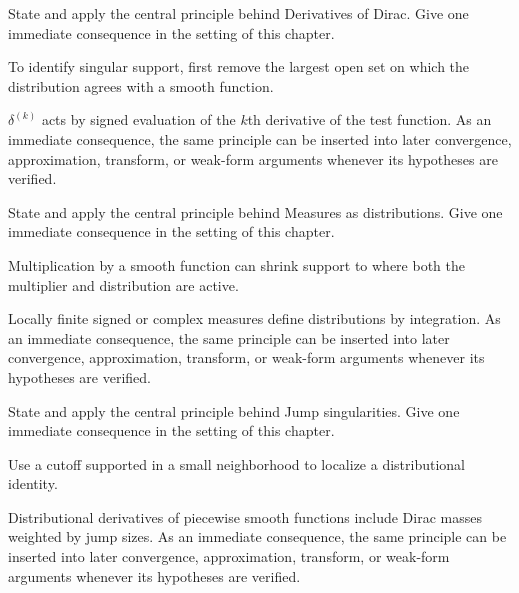 \begin{exercise}\label{exr:iii17-04}
State and apply the central principle behind Derivatives of Dirac. Give one immediate consequence in the setting of this chapter.
\end{exercise}
\begin{hint}
To identify singular support, first remove the largest open set on which the distribution agrees with a smooth function.
\end{hint}
\begin{solution}
$\delta^{(k)}$ acts by signed evaluation of the $k$th derivative of the test function. As an immediate consequence, the same principle can be inserted into later convergence, approximation, transform, or weak-form arguments whenever its hypotheses are verified.
\end{solution}

\begin{exercise}\label{exr:iii17-05}
State and apply the central principle behind Measures as distributions. Give one immediate consequence in the setting of this chapter.
\end{exercise}
\begin{hint}
Multiplication by a smooth function can shrink support to where both the multiplier and distribution are active.
\end{hint}
\begin{solution}
Locally finite signed or complex measures define distributions by integration. As an immediate consequence, the same principle can be inserted into later convergence, approximation, transform, or weak-form arguments whenever its hypotheses are verified.
\end{solution}

\begin{exercise}\label{exr:iii17-06}
State and apply the central principle behind Jump singularities. Give one immediate consequence in the setting of this chapter.
\end{exercise}
\begin{hint}
Use a cutoff supported in a small neighborhood to localize a distributional identity.
\end{hint}
\begin{solution}
Distributional derivatives of piecewise smooth functions include Dirac masses weighted by jump sizes. As an immediate consequence, the same principle can be inserted into later convergence, approximation, transform, or weak-form arguments whenever its hypotheses are verified.
\end{solution}

